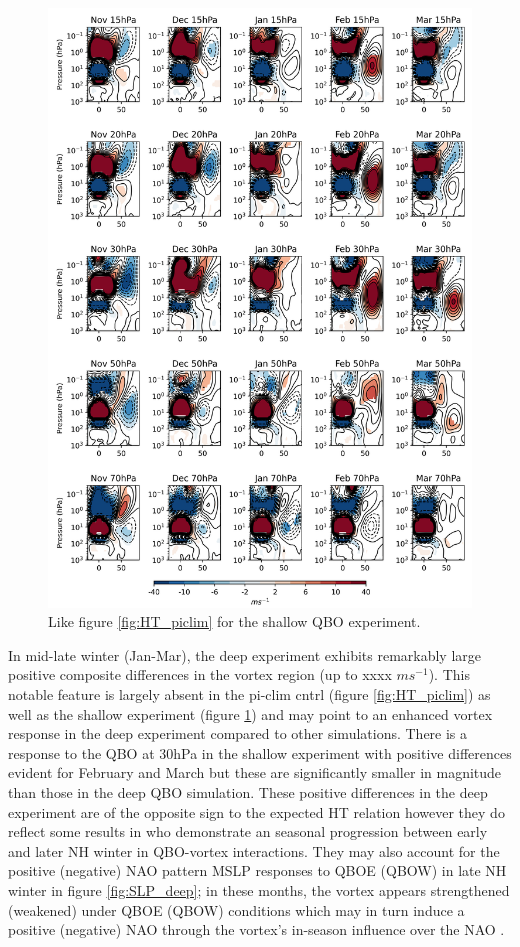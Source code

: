 \begin{figure}[h!]
\begin{center}
\noindent\includegraphics[width = 0.8\linewidth]{Figures/Figures-deepQBO/ZMZW_composites_by_month_QBO_phases_U_s_MarQBO_vs_Mar_70hPa_5thresh.png}
\caption[ZMZW composites under different QBO phases in the shallow QBO simulation]{Like figure \ref{fig:HT_piclim} for the shallow QBO experiment.}
\label{fig:HT_shallow}
\end{center}
\end{figure}
\newpage 

In mid-late winter (Jan-Mar), the deep experiment exhibits remarkably large positive composite differences in the vortex region (up to xxxx $ms^{-1}$). This notable feature is largely absent in the pi-clim cntrl (figure \ref{fig:HT_piclim}) as well as the shallow experiment (figure \ref{fig:HT_shallow}) and may point to an enhanced vortex response in the deep experiment compared to other simulations. There is a response to the QBO at 30hPa in the shallow experiment with positive differences evident for February and March but these are significantly smaller in magnitude than those in the deep QBO simulation. These positive differences in the deep experiment are of the opposite sign to the expected HT relation however they do reflect some results in \cite{graySurface2018b} who demonstrate an seasonal progression between early and later NH winter in QBO-vortex interactions. They may also account for the positive (negative) NAO pattern MSLP responses to QBOE (QBOW) in late NH winter in figure \ref{fig:SLP_deep}; in these months, the vortex appears strengthened (weakened) under QBOE (QBOW) conditions which may in turn induce a positive (negative) NAO through the vortex's in-season influence over the NAO \citep{charlton-perezInfluence2018e}. 

